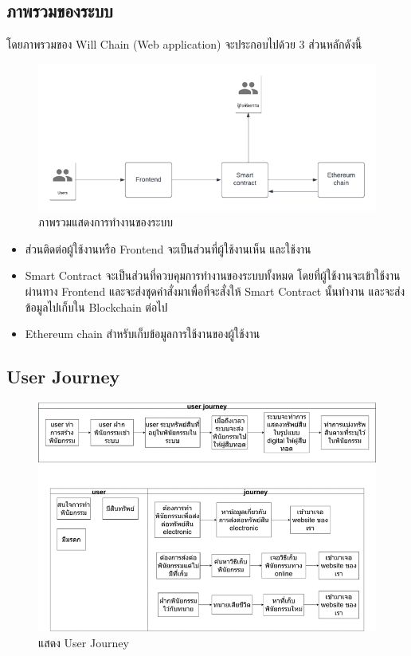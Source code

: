\documentclass[12pt,oneside,openright,a4paper]{cpe-thai-project}
\begin{document}
\subsection{ภาพรวมของระบบ}
\tab โดยภาพรวมของ Will Chain (Web application) จะประกอบไปด้วย 3 ส่วนหลักดังนี้
	\begin{figure}[h]
		\centering
		\includegraphics[scale=0.8]{Overall_system}
		\caption{ภาพรวมแสดงการทำงานของระบบ}
	\end{figure}
	\begin{itemize}[leftmargin=0pt,itemindent=2.5cm]
		\item ส่วนติดต่อผู้ใช้งานหรือ Frontend จะเป็นส่วนที่ผู้ใช้งานเห็น และใช้งาน
		\item Smart Contract จะเป็นส่วนที่ควบคุมการทำงานของระบบทั้งหมด โดยที่ผู้ใช้งานจะเข้าใช้งานผ่านทาง Frontend และจะส่งชุดคำสั่งมาเพื่อที่จะสั่งให้ Smart Contract นั้นทำงาน และจะส่งข้อมูลไปเก็บใน Blockchain ต่อไป
		\item Ethereum chain สำหรับเก็บข้อมูลการใช้งานของผู้ใช้งาน
	\end{itemize}

\subsection{User Journey}
	\begin{figure}[h]
		\centering
		\includegraphics[scale=0.8]{UserJourney}
		\caption{แสดง User Journey}
	\end{figure}
\FloatBarrier
\hfill\\
\hfill\\
\hfill\\
\end{document}
